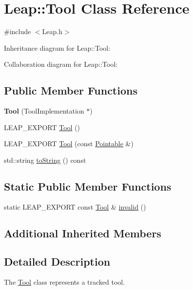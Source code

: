 \hypertarget{class_leap_1_1_tool}{}\section{Leap\+:\+:Tool Class Reference}
\label{class_leap_1_1_tool}


{\ttfamily \#include $<$Leap.\+h$>$}



Inheritance diagram for Leap\+:\+:Tool\+:


Collaboration diagram for Leap\+:\+:Tool\+:
\subsection*{Public Member Functions}
\begin{DoxyCompactItemize}
\item 
\mbox{\label{class_leap_1_1_tool_a856522513b4dbf3ef4e2a9a9667f5735}} 
{\bfseries Tool} (Tool\+Implementation $\ast$)
\item 
L\+E\+A\+P\+\_\+\+E\+X\+P\+O\+RT \hyperlink{class_leap_1_1_tool_a6debbdfc14096362bf32228ba3e5c72f}{Tool} ()
\item 
L\+E\+A\+P\+\_\+\+E\+X\+P\+O\+RT \hyperlink{class_leap_1_1_tool_a6dfea4c318389bcc6d1ef373d7a4432e}{Tool} (const \hyperlink{class_leap_1_1_pointable}{Pointable} \&)
\item 
std\+::string \hyperlink{class_leap_1_1_tool_a0a5eb02f6687ad828cf0f9f1e6494a44}{to\+String} () const
\end{DoxyCompactItemize}
\subsection*{Static Public Member Functions}
\begin{DoxyCompactItemize}
\item 
static L\+E\+A\+P\+\_\+\+E\+X\+P\+O\+RT const \hyperlink{class_leap_1_1_tool}{Tool} \& \hyperlink{class_leap_1_1_tool_af47b7fe3674536f265470e7ab3467ef1}{invalid} ()
\end{DoxyCompactItemize}
\subsection*{Additional Inherited Members}


\subsection{Detailed Description}
The \hyperlink{class_leap_1_1_tool}{Tool} class represents a tracked tool.

